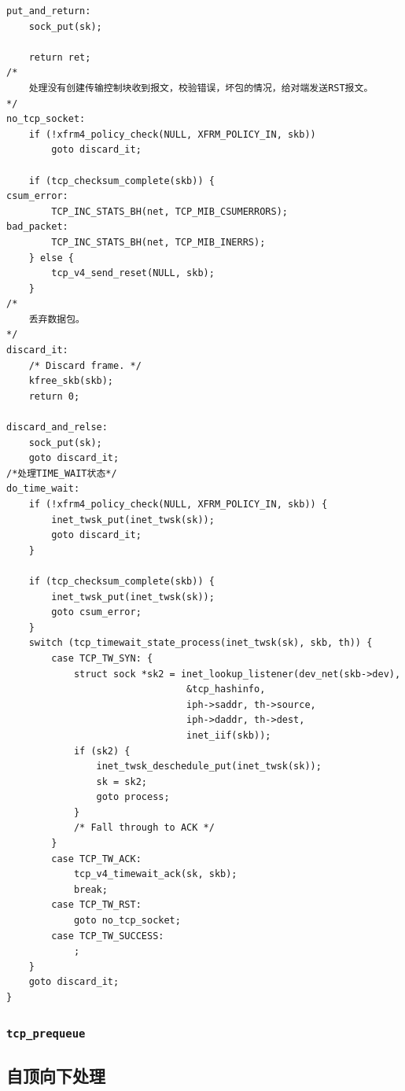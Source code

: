 \begin{verbatim}
put_and_return:
	sock_put(sk);

	return ret;
/*
	处理没有创建传输控制块收到报文，校验错误，坏包的情况，给对端发送RST报文。
*/
no_tcp_socket:
	if (!xfrm4_policy_check(NULL, XFRM_POLICY_IN, skb))
		goto discard_it;

	if (tcp_checksum_complete(skb)) {
csum_error:
		TCP_INC_STATS_BH(net, TCP_MIB_CSUMERRORS);
bad_packet:
		TCP_INC_STATS_BH(net, TCP_MIB_INERRS);
	} else {
		tcp_v4_send_reset(NULL, skb);
	}
/*
	丢弃数据包。	
*/
discard_it:
	/* Discard frame. */
	kfree_skb(skb);
	return 0;

discard_and_relse:
	sock_put(sk);
	goto discard_it;
/*处理TIME_WAIT状态*/
do_time_wait:
	if (!xfrm4_policy_check(NULL, XFRM_POLICY_IN, skb)) {
		inet_twsk_put(inet_twsk(sk));
		goto discard_it;
	}

	if (tcp_checksum_complete(skb)) {
		inet_twsk_put(inet_twsk(sk));
		goto csum_error;
	}
	switch (tcp_timewait_state_process(inet_twsk(sk), skb, th)) {
		case TCP_TW_SYN: {
			struct sock *sk2 = inet_lookup_listener(dev_net(skb->dev),
								&tcp_hashinfo,
								iph->saddr, th->source,
								iph->daddr, th->dest,
								inet_iif(skb));
			if (sk2) {
				inet_twsk_deschedule_put(inet_twsk(sk));
				sk = sk2;
				goto process;
			}
			/* Fall through to ACK */
		}
		case TCP_TW_ACK:
			tcp_v4_timewait_ack(sk, skb);
			break;
		case TCP_TW_RST:
			goto no_tcp_socket;
		case TCP_TW_SUCCESS:
			;
	}
	goto discard_it;
}
\end{verbatim}

			\subsubsection{\texttt{tcp_prequeue}}
	
		\subsection{自顶向下处理}
